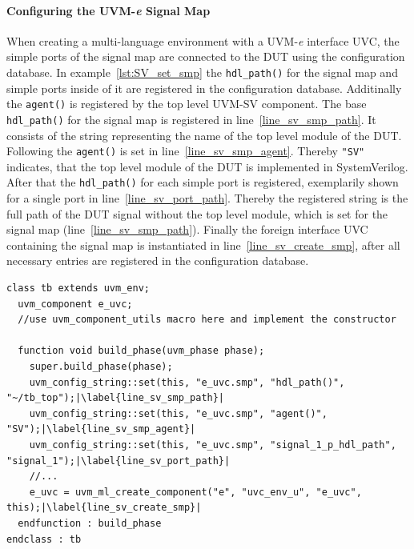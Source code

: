 \paragraph{Configuring the UVM-\textit{e} Signal Map}
When creating a multi-language environment with a UVM-\textit{e} interface UVC, the simple ports of the signal map are connected to the DUT using the configuration database. In example~\ref{lst:SV_set_smp} the \lstinline$hdl_path()$ for the signal map and simple ports inside of it are registered in the configuration database. Additinally the \lstinline$agent()$ is registered by the top level UVM-SV component. The base \lstinline$hdl_path()$ for the signal map is registered in line~\ref{line_sv_smp_path}. It consists of the string representing the name of the top level module of the DUT. Following the \lstinline$agent()$ is set in line~\ref{line_sv_smp_agent}. Thereby \lstinline$"SV"$ indicates, that the top level module of the DUT is implemented in SystemVerilog. After that the \lstinline$hdl_path()$ for each simple port is registered, exemplarily shown for a single port in line~\ref{line_sv_port_path}. Thereby the registered string is the full path of the DUT signal without the top level module, which is set for the signal map (line~\ref{line_sv_smp_path}).
Finally the foreign interface UVC containing the signal map is instantiated in line~\ref{line_sv_create_smp}, after all necessary entries are registered in the configuration database.
\lstset{language=SystemVerilog, numbers = left, escapechar=|, breaklines=true}
\begin{lstlisting}[frame=htrbl, caption={SystemVerilog: configuring the simple ports of the UVM-\textit{e} signal map},
label={lst:SV_set_smp}]
class tb extends uvm_env;
  uvm_component e_uvc;
  //use uvm_component_utils macro here and implement the constructor

  function void build_phase(uvm_phase phase);
    super.build_phase(phase);
    uvm_config_string::set(this, "e_uvc.smp", "hdl_path()",          "~/tb_top");|\label{line_sv_smp_path}|
    uvm_config_string::set(this, "e_uvc.smp", "agent()",             "SV");|\label{line_sv_smp_agent}|
    uvm_config_string::set(this, "e_uvc.smp", "signal_1_p_hdl_path", "signal_1");|\label{line_sv_port_path}|
    //...
    e_uvc = uvm_ml_create_component("e", "uvc_env_u", "e_uvc", this);|\label{line_sv_create_smp}|
  endfunction : build_phase
endclass : tb
\end{lstlisting}
